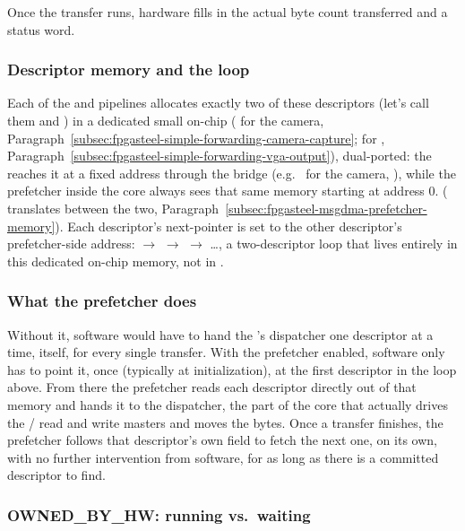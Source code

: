 Once the transfer runs, hardware fills in the actual byte count transferred and a status word.

\subsubsection{Descriptor memory and the loop}

Each of the  and  pipelines allocates exactly two of these descriptors (let's call them  and ) in a dedicated small on-chip  ( for the camera, Paragraph~\ref{subsec:fpgasteel-simple-forwarding-camera-capture};  for , Paragraph~\ref{subsec:fpgasteel-simple-forwarding-vga-output}), dual-ported: the  reaches it at a fixed address through the  bridge (e.g.\  for the camera, ), while the prefetcher inside the  core always sees that same memory starting at address 0. ( translates between the two, Paragraph~\ref{subsec:fpgasteel-msgdma-prefetcher-memory}). Each descriptor's next-pointer is set to the other descriptor's prefetcher-side address:  $\rightarrow$  $\rightarrow$  $\rightarrow$ \ldots, a two-descriptor loop that lives entirely in this dedicated on-chip memory, not in .

\subsubsection{What the prefetcher does}

Without it, software would have to hand the 's dispatcher one descriptor at a time, itself, for every single transfer. With the prefetcher enabled, software only has to point it, once (typically at initialization), at the first descriptor in the loop above. From there the prefetcher reads each descriptor directly out of that memory and hands it to the dispatcher, the part of the  core that actually drives the / read and write masters and moves the bytes. Once a transfer finishes, the prefetcher follows that descriptor's own  field to fetch the next one, on its own, with no further intervention from software, for as long as there is a committed descriptor to find.

\subsubsection{OWNED\_BY\_HW: running vs.\ waiting}

